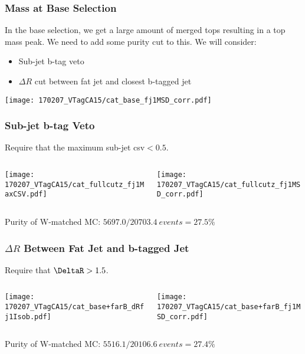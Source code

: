 \documentclass{beamer}
\begin{document}
\begin{frame}
  \frametitle{Mass at Base Selection}

  In the base selection, we get a large amount of merged tops resulting in a top mass peak.
  We need to add some purity cut to this.
  We will consider:
  \begin{itemize}
  \item Sub-jet b-tag veto
  \item $\Delta R$ cut between fat jet and closest b-tagged jet
  \end{itemize}

  \centering
  \texttt{[image: 170207\_VTagCA15/cat\_base\_fj1MSD\_corr.pdf]}

\end{frame}

\begin{frame}
  \frametitle{Sub-jet b-tag Veto}

  Require that the maximum sub-jet csv$ < 0.5$.

  \vspace{6pt}

  \begin{columns}
    \begin{column}{0.5\linewidth}
      \texttt{[image: 170207\_VTagCA15/cat\_fullcutz\_fj1MaxCSV.pdf]}
    \end{column}
    \begin{column}{0.5\linewidth}
      \texttt{[image: 170207\_VTagCA15/cat\_fullcutz\_fj1MSD\_corr.pdf]}
    \end{column}
  \end{columns}

  \vspace{6pt}

  Purity of W-matched MC: $5697.0/\SI{20703.4}{events} = 27.5\%$

\end{frame}

\begin{frame}
  \frametitle{$\Delta R$ Between Fat Jet and b-tagged Jet}

  Require that $\DeltaR > 1.5$.

  \vspace{6pt}

  \begin{columns}
    \begin{column}{0.5\linewidth}
      \texttt{[image: 170207\_VTagCA15/cat\_base+farB\_dRfj1Isob.pdf]}
    \end{column}
    \begin{column}{0.5\linewidth}
      \texttt{[image: 170207\_VTagCA15/cat\_base+farB\_fj1MSD\_corr.pdf]}
    \end{column}
  \end{columns}

  \vspace{6pt}

  Purity of W-matched MC: $5516.1/\SI{20106.6}{events} = 27.4\%$

\end{frame}
\end{document}
